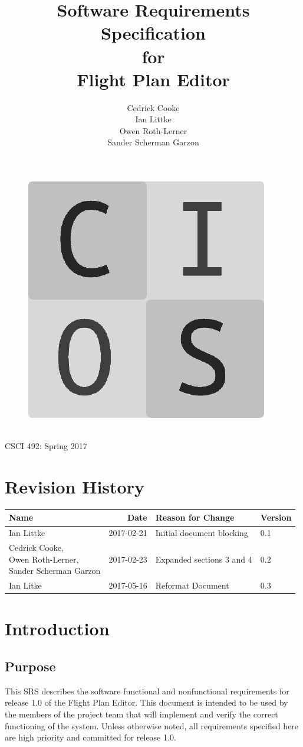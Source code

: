 \documentclass[12pt, letterpaper]{article}
\title{Software Requirements Specification\\for\\Flight Plan Editor}
\date{}
\author{
Cedrick Cooke\\
Ian Littke\\
Owen Roth-Lerner\\
Sander Scherman Garzon\\
}
\makeatletter
\renewcommand{\maketitle}{\bgroup\setlength{\parindent}{0pt}
\thispagestyle{empty}
\null
  \begin{flushleft}
  \vspace{15mm}
  \vskip2mm
  \Huge{\textbf{\@title}}
  \vspace{7cm}
\begin{figure}[ht]
  \begin{minipage}[b]{0.45\linewidth}
    \includegraphics[width=.75\textwidth]{images/cios.png}
  \end{minipage}
  \hspace{0.5cm}
  \begin{minipage}[b][][c]{0.45\linewidth}
    \LARGE{\@author}
  \vspace{0.35cm}
  \end{minipage}
\end{figure}
\\CSCI 492: Spring 2017\\
  \end{flushleft}\egroup
}
\makeatother
\begin{document}
\maketitle

\newpage
\pagestyle{style2}
\setcounter{page}{1}
\section*{Revision History}
\begin{tabularx}{\textwidth}{l r X l}
\textbf{Name} & \textbf{Date} & \textbf{Reason for Change} & \textbf{Version} \\
\hline
\hline
Ian Littke & 2017-02-21 & Initial document blocking & 0.1 \\
\makecell[cl]{Cedrick Cooke,\\ Owen Roth-Lerner,\\ Sander Scherman Garzon} & 2017-02-23 & Expanded sections 3 and 4 & 0.2 \\
Ian Litke & 2017-05-16 & Reformat Document & 0.3 \\
          \hline
\end{tabularx}

\newpage

\tableofcontents
\newpage
{}
\pagestyle{style1}
\setcounter{page}{1}

\section{Introduction}
  \subsection{Purpose}
    This SRS describes the software functional and nonfunctional requirements
    for release 1.0 of the Flight Plan Editor.
    This document is intended to be used by the members of the project team that will implement
    and verify the correct functioning of the system.
    Unless otherwise noted, all requirements specified here are high priority
    and committed for release 1.0.
\end{document}
